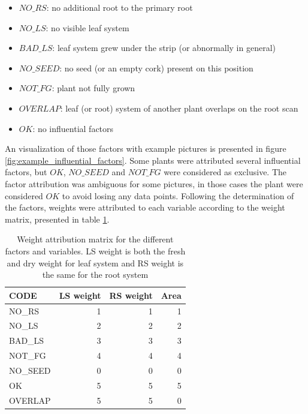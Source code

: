 \begin{itemize}
\item $NO\_RS$: no additional root to the primary root
\item $NO\_LS$: no visible leaf system 
\item $BAD\_LS$: leaf system grew under the strip (or abnormally in general)
\item  $NO\_SEED$: no seed (or an empty cork) present on this position
\item $NOT\_FG$: plant not fully grown
\item $OVERLAP$: leaf (or root) system of another plant overlaps on the root scan
\item $OK$: no influential factors
\end{itemize} 

An visualization of those factors with example pictures is presented in figure \ref{fig:example_influential_factors}. Some plants were attributed several influential factors, but $OK$, $NO\_SEED$ and $NOT\_FG$ were considered as exclusive. The factor attribution was ambiguous for some pictures, in those cases the plant were considered $OK$ to avoid losing any data points.
Following the determination of the factors, weights were attributed to each variable according to the weight matrix, presented in table \ref{tab:weight_attribution_matrix}.


\begin{table}[htbp]
  \centering
  \caption[Weight attribution matrix]{Weight attribution matrix for the different factors and variables. LS weight is both the fresh and dry weight for leaf system and RS weight is the same for the root system}
    \begin{tabular}{lrrr}
    \toprule
    CODE  & LS weight & RS weight & Area \\
    \midrule
    NO\_RS & 1     & 1     & 1 \\
    NO\_LS & 2     & 2     & 2 \\
    BAD\_LS & 3     & 3     & 3 \\
    NOT\_FG & 4     & 4     & 4 \\
    NO\_SEED & 0	& 0		& 0 \\
    OK 		& 5 	& 5 	& 5 \\
    OVERLAP & 5     & 5     & 0 \\
    \bottomrule
    \end{tabular}%
  \label{tab:weight_attribution_matrix}%
\end{table}%


